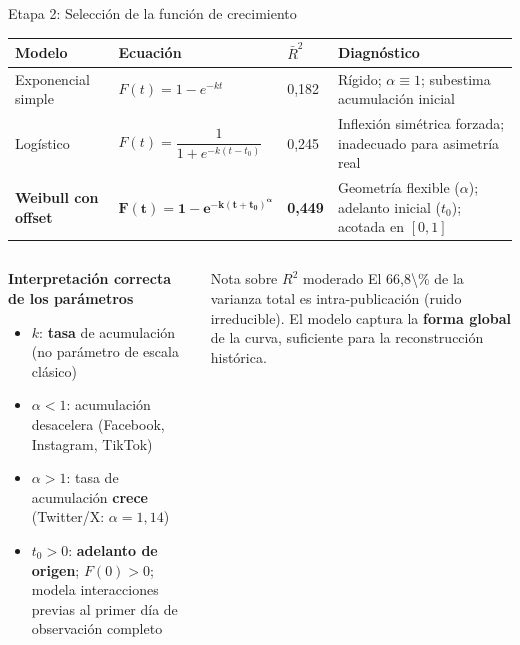 \begin{frame}{Etapa 2: Selección de la función de crecimiento}
  \begin{center}
  {\setlength{\tabcolsep}{3pt}
  \scriptsize
  \begin{tabular}{L{2.6cm} L{3.8cm} C{1.3cm} L{4.6cm}}
    \toprule
    {\color{white}\textbf{Modelo}} &
    {\color{white}\textbf{Ecuación}} &
    {\color{white}\textbf{$\bar{R}^2$}} &
    {\color{white}\textbf{Diagnóstico}} \\
    \midrule
    Exponencial simple &
      $F(t) = 1 - e^{-kt}$ &
      0,182 &
      Rígido; $\alpha \equiv 1$; subestima acumulación inicial \\
    Logístico &
      $F(t) = \dfrac{1}{1+e^{-k(t-t_0)}}$ &
      0,245 &
      Inflexión simétrica forzada; inadecuado para asimetría real \\
    \textbf{Weibull con offset} &
      $\bm{F(t) = 1 - e^{-k(t+t_0)^{\alpha}}}$ &
      \textbf{0,449} &
      Geometría flexible ($\alpha$); adelanto inicial ($t_0$); acotada en $[0,1]$ \\
    \bottomrule
  \end{tabular}}
  \end{center}

  \vspace{0.2em}
  \begin{columns}[T]
    \begin{column}{0.55\textwidth}
      \small\textbf{Interpretación correcta de los parámetros} \corr{[Corr.\ 1.6]}
      \begin{itemize}\small
        \item $k$: \textbf{tasa} de acumulación (no parámetro de escala clásico)
        \item $\alpha < 1$: acumulación desacelera (Facebook, Instagram, TikTok)
        \item $\alpha > 1$: tasa de acumulación \textbf{crece} (Twitter/X: $\alpha = 1{,}14$)
        \item $t_0 > 0$: \textbf{adelanto de origen}; $F(0) > 0$; modela interacciones
              previas al primer día de observación completo
      \end{itemize}
    \end{column}
    \begin{column}{0.41\textwidth}
      \begin{exampleblock}{Nota sobre $R^2$ moderado}
        \small El \num{66,8\%} de la varianza total es intra-publicación (ruido irreducible).
        El modelo captura la \textbf{forma global} de la curva, suficiente para la
        reconstrucción histórica.
      \end{exampleblock}
    \end{column}
  \end{columns}
\end{frame}

